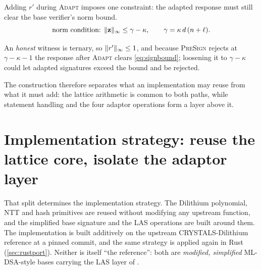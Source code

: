 Adding $r'$ during \textsc{Adapt} imposes one constraint: the adapted response must still
clear the base verifier's norm bound.
\begin{equation}
  \label{eq:signbound}
  \text{norm condition: } \lVert \mathbf{z} \rVert_\infty \le \gamma-\kappa,
  \qquad \gamma = \kappa\, d\,(n+\ell).
\end{equation}

An \emph{honest} witness is ternary, so
$\lVert r' \rVert_\infty\le 1$, and because \textsc{PreSign} rejects at $\gamma-\kappa-1$ the response
after \textsc{Adapt} clears \cref{eq:signbound}; loosening it to $\gamma-\kappa$ could let
adapted signatures exceed the bound and be rejected.

The construction therefore separates what an implementation may reuse from what it must
add: the lattice arithmetic is common to both paths, while statement handling and the
four adaptor operations form a layer above it.

\section{Implementation strategy: reuse the lattice core, isolate the adaptor layer}
\label{sec:impl}

That split determines the implementation strategy. The Dilithium polynomial, NTT and hash
primitives are reused without modifying any upstream function, and the simplified base
signature and the LAS operations are built around them. The implementation is
built additively on the upstream CRYSTALS-Dilithium reference
\cite{ducas2018crystals,pqcrystalsdilithium} at a pinned commit, and the same strategy is
applied again in Rust (\cref{sec:rustport}). Neither is itself ``the reference'': both are
\emph{modified, simplified} ML-DSA-style bases carrying the LAS layer of
\cite{esgin2020post}.

